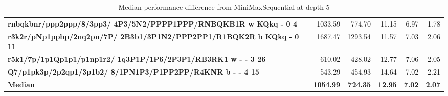 \begin{table}[H]
{\begin{tabular}{|p{8cm}|*{5}{r|}}
\rowcolor[HTML]{FFFFFF}
\textbf{rnbqkbnr/ppp2ppp/8/3pp3/ 4P3/5N2/PPPP1PPP/RNBQKB1R w KQkq - 0 4}               & 1033.59 & 774.70 & 11.15 & 6.97 & 1.78 \\

\rowcolor[HTML]{EFEFEF}
\textbf{r3k2r/pNp1ppbp/2nq2pn/7P/ 2B3b1/3P1N2/PPP2PP1/R1BQK2R b KQkq - 0 11}               & 1687.47 & 1293.54 & 11.57 & 7.03 & 2.06 \\

\rowcolor[HTML]{FFFFFF}
\textbf{r5k1/7p/1p1Qp1p1/p1np1r2/ 1q3P1P/1P6/2P3P1/RB3RK1 w - - 3 26}               & 610.02 & 428.02 & 12.77 & 7.06 & 2.05 \\

\rowcolor[HTML]{EFEFEF}
\textbf{Q7/p1pk3p/2p2qp1/3p1b2/ 8/1PN1P3/P1PP2PP/R4KNR b - - 4 15}               & 543.29 & 454.93 & 14.64 & 7.02 & 2.21 \\
\hline
\hline
\rowcolor[HTML]{FFFFFF}
\textbf{Median}               & \textbf{1054.99} & \textbf{724.35} & \textbf{12.95} & \textbf{7.02} & \textbf{2.07} \\

            \hline
        \end{tabular}%
    }
    \caption{Median performance difference from MiniMaxSequential at depth 5}
    \label{tab:median-performance-difference-from-minimaxsequential-at-depth-5}
\end{table}
